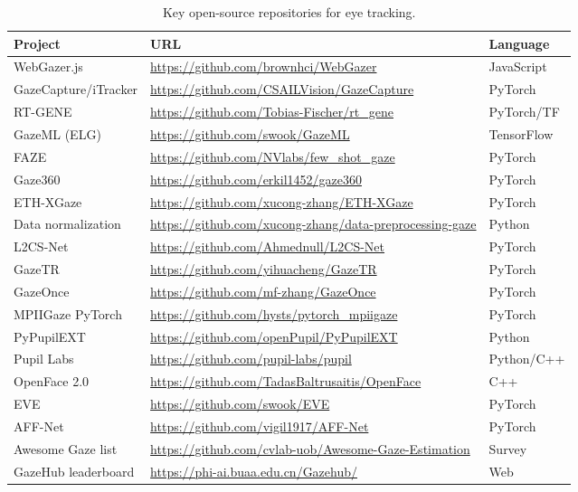 \documentclass[11pt,a4paper]{article}
\begin{document}
\begin{table}[H]
  \centering
  \caption{Key open-source repositories for eye tracking.}
  \small
  \begin{tabular}{lll}
    \toprule
    \textbf{Project} & \textbf{URL} & \textbf{Language} \\
    \midrule
    WebGazer.js       & \url{https://github.com/brownhci/WebGazer}               & JavaScript \\
    GazeCapture/iTracker & \url{https://github.com/CSAILVision/GazeCapture}       & PyTorch \\
    RT-GENE           & \url{https://github.com/Tobias-Fischer/rt_gene}           & PyTorch/TF \\
    GazeML (ELG)      & \url{https://github.com/swook/GazeML}                    & TensorFlow \\
    FAZE              & \url{https://github.com/NVlabs/few_shot_gaze}             & PyTorch \\
    Gaze360           & \url{https://github.com/erkil1452/gaze360}                & PyTorch \\
    ETH-XGaze         & \url{https://github.com/xucong-zhang/ETH-XGaze}           & PyTorch \\
    Data normalization & \url{https://github.com/xucong-zhang/data-preprocessing-gaze} & Python \\
    L2CS-Net          & \url{https://github.com/Ahmednull/L2CS-Net}               & PyTorch \\
    GazeTR            & \url{https://github.com/yihuacheng/GazeTR}                & PyTorch \\
    GazeOnce          & \url{https://github.com/mf-zhang/GazeOnce}                & PyTorch \\
    MPIIGaze PyTorch  & \url{https://github.com/hysts/pytorch_mpiigaze}           & PyTorch \\
    PyPupilEXT        & \url{https://github.com/openPupil/PyPupilEXT}             & Python \\
    Pupil Labs        & \url{https://github.com/pupil-labs/pupil}                 & Python/C++ \\
    OpenFace 2.0      & \url{https://github.com/TadasBaltrusaitis/OpenFace}       & C++ \\
    EVE               & \url{https://github.com/swook/EVE}                        & PyTorch \\
    AFF-Net           & \url{https://github.com/vigil1917/AFF-Net}                & PyTorch \\
    Awesome Gaze list & \url{https://github.com/cvlab-uob/Awesome-Gaze-Estimation}& Survey \\
    GazeHub leaderboard & \url{https://phi-ai.buaa.edu.cn/Gazehub/}               & Web \\
    \bottomrule
  \end{tabular}
\end{table}
\end{document}
